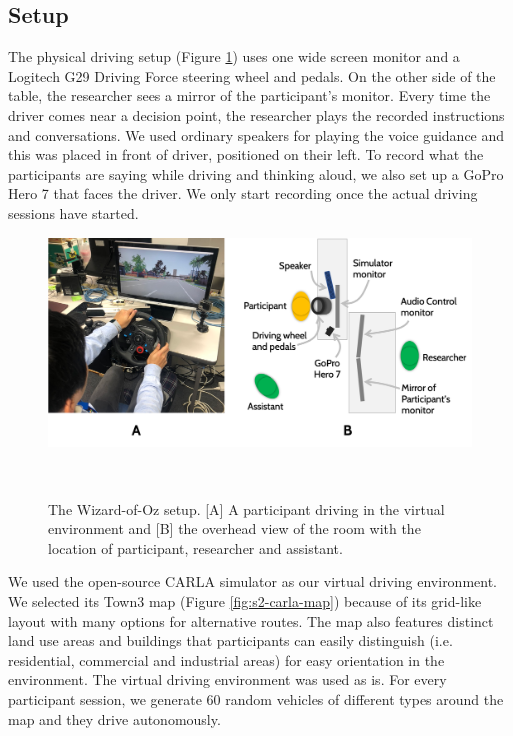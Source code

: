 \subsection{Setup}
The physical driving setup (Figure \ref{fig:s2-oz-setup}) uses one wide screen monitor and a Logitech G29 Driving Force steering wheel and pedals. On the other side of the table, the researcher sees a mirror of the participant's monitor. Every time the driver comes near a decision point, the researcher plays the recorded instructions and conversations. We used ordinary speakers for playing the voice guidance and this was placed in front of driver, positioned on their left. To record what the participants are saying while driving and thinking aloud, we also set up a GoPro Hero 7 that faces the driver. We only start recording once the actual driving sessions have started.

\begin{figure}
\centering
  \includegraphics[scale=0.5]{figures/s2-oz-setup.png}
  \caption{The Wizard-of-Oz setup. [A] A participant driving in the virtual environment and [B] the overhead view of the room with the location of participant, researcher and assistant.}~\label{fig:s2-oz-setup}
\end{figure}

We used the open-source CARLA simulator \cite{Dosovitskiy17} as our virtual driving environment. We selected its Town3 map (Figure \ref{fig:s2-carla-map}) because of its grid-like layout with many options for alternative routes. The map also features distinct land use areas and buildings that participants can easily distinguish (i.e. residential, commercial and industrial areas) for easy orientation in the environment. The virtual driving environment was used as is. For every participant session, we generate 60 random vehicles of different types around the map and they drive autonomously. 

